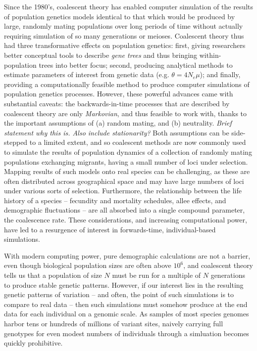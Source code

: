 \documentclass{article}
\newcommand{\plr}[1]{{\em \color{blue} #1}}
\begin{document}
Since the 1980's, coalescent theory has enabled computer simulation of the results of population genetics models
identical to that which would be produced by large, randomly mating populations over long periods of time
without actually requiring simulation of so many generations or meioses.
Coalescent theory thus had three transformative effects on population genetics:
first, giving researchers better conceptual tools to describe \emph{gene trees} and thus bringing within-population trees into better focus;
second, producing analytical methods to estimate parameters of interest from genetic data (e.g. $\theta = 4N_e \mu$);
and finally, providing a computationally feasible method to produce computer simulations of population genetics processes.
However, these powerful advances came with substantial caveats:
the backwards-in-time processes that are described by coalescent theory
are only \emph{Markovian}, and thus feasible to work with,
thanks to the important assumptions of (a) random mating, and (b) neutrality.
\plr{Brief statement why this is.  Also include stationarity?}
Both assumptions can be side-stepped to a limited extent, and so coalescent methods are now commonly used to
simulate the results of population dynamics of a collection of randomly mating populations exchanging migrants,
having a small number of loci under selection.
Mapping results of such models onto real species can be challenging,
as these are often distributed across geographical space and may have large numbers of loci under various sorts of selection.
Furthermore, the relationship between the life history of a species --
fecundity and mortality schedules, allee effects, and demographic fluctuations --
are all absorbed into a single compound parameter, the coalescence rate.
These considerations, and increasing computational power, have led to a resurgence of interest in forwards-time, individual-based simulations.

With modern computing power, pure demographic calculations are not a barrier,
even though biological population sizes are often above $10^6$,
and coalescent theory tells us that a population of size $N$ 
must be run for a multiple of $N$ generations to produce stable genetic patterns.
However, if our interest lies in the resulting genetic patterns of variation
-- and often, the point of such simulations is to compare to real data --
then such simulations must somehow produce at the end data for each individual on a genomic scale.
As samples of most species genomes harbor tens or hundreds of millions of variant sites,
naively carrying full genotypes for even modest numbers of individuals through a simluation becomes quickly prohibitive.
\end{document}

